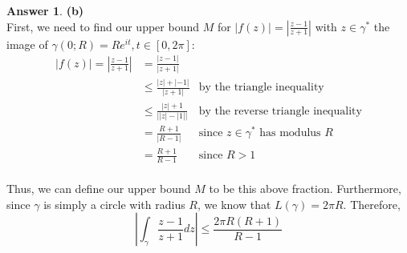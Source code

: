 \documentclass[10pt,a4paper]{article}
\theoremstyle{definition}
\newtheorem*{answer*}{Answer}
\begin{document}
\begin{answer*}{\textbf{(b)}}
\\First, we need to find our upper bound $M$ for $\displaystyle |f(z)| = \left|\frac{z-1}{z + 1}\right|$ with $z \in \gamma^*$ the image of $\gamma(0;R) = Re^{it}, t \in [0, 2\pi]$:
\begin{align*}
|f(z)| = \left|\frac{z-1}{z + 1}\right|
&= \frac{|z - 1|}{|z + 1|}\\
&\leq \frac{|z| + |-1|}{|z + 1|} &\text{by the triangle inequality}\\
&\leq \frac{|z| + 1}{\displaystyle \left| |z| - |1| \right|} &\text{by the reverse triangle inequality}\\
&= \frac{R + 1}{|R - 1|} &\text{since } z \in \gamma^* \text{ has modulus }R\\
&= \frac{R + 1}{R - 1} &\text{since } R>1\\
\end{align*}

Thus, we can define our upper bound $M$ to be this above fraction. Furthermore, since $\gamma$ is simply a circle with radius $R$, we know that $L(\gamma) = 2\pi R$. Therefore,
\[\boxed{\left|\int_{\gamma} \frac{z - 1}{z + 1}dz\right| \leq \frac{2\pi R(R+1)}{R-1}}\]
\end{answer*}
\end{document}

